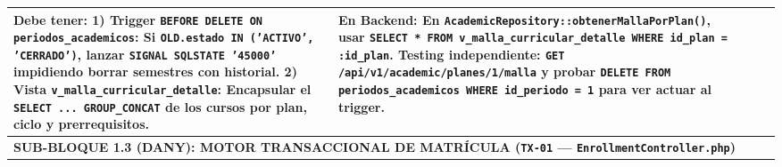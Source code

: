 \documentclass[10pt,a4paper,landscape]{article}
\begin{document}
\begin{longtable}{|p{0.5cm}|p{3.8cm}|p{2.9cm}|p{8.8cm}|p{9.2cm}|}
\textbf{Debe tener:}
1) \textbf{Trigger \texttt{BEFORE DELETE ON periodos\_academicos}:} Si \texttt{OLD.estado IN ('ACTIVO', 'CERRADO')}, lanzar \texttt{SIGNAL SQLSTATE '45000'} impidiendo borrar semestres con historial.
2) \textbf{Vista \texttt{v\_malla\_curricular\_detalle}:} Encapsular el \texttt{SELECT ... GROUP\_CONCAT} de los cursos por plan, ciclo y prerrequisitos. & 
\textbf{En Backend:} En \texttt{AcademicRepository::obtenerMallaPorPlan()}, usar \texttt{SELECT * FROM v\_malla\_curricular\_detalle WHERE id\_plan = :id\_plan}.\newline
\textbf{Testing independiente:} \texttt{GET /api/v1/academic/planes/1/malla} y probar \texttt{DELETE FROM periodos\_academicos WHERE id\_periodo = 1} para ver actuar al trigger. \\
\hline

\multicolumn{5}{|l|}{\cellcolor{danyHeader}\textbf{\textcolor{unjbgNavy}{SUB-BLOQUE 1.3 (DANY): MOTOR TRANSACCIONAL DE MATRÍCULA (\texttt{TX-01} — \texttt{EnrollmentController.php})}}} \\
\hline


\end{longtable}
\end{document}
